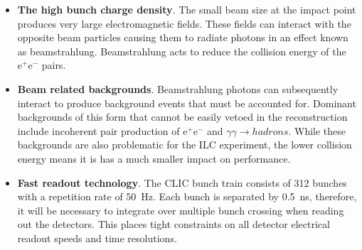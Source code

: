 \begin{itemize}
\item \textbf{The high bunch charge density}.  The small beam size at the impact point produces very large electromagnetic fields.  These fields can interact with the opposite beam particles causing them to radiate photons in an effect known as beamstrahlung.  Beamstrahlung acts to reduce the collision energy of the $\text{e}^{+}\text{e}^{-}$ pairs.   
\item \textbf{Beam related backgrounds}.  Beamstrahlung photons can subsequently interact to produce background events that must be accounted for.  Dominant backgrounds of this form that cannot be easily vetoed in the reconstruction include incoherent pair production of $\text{e}^{+}\text{e}^{-}$ and $\gamma\gamma \rightarrow hadrons$.  While these backgrounds are also problematic for the ILC experiment, the lower collision energy means it is has a much smaller impact on performance.
\item \textbf{Fast readout technology}.  The CLIC bunch train consists of 312 bunches with a repetition rate of 50~Hz.  Each bunch is separated by 0.5~ns, therefore, it will be necessary to integrate over multiple bunch crossing when reading out the detectors.  This places tight constraints on all detector electrical readout speeds and time resolutions.   
\end{itemize}


